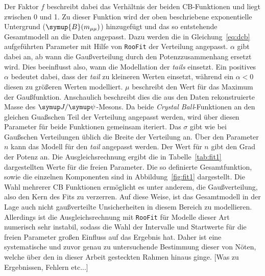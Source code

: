 %
Der Faktor $f$ beschreibt dabei das Verhältnis der beiden CB-Funktionen und liegt zwischen 0 und 1. Zu dieser Funktion wird der oben beschriebene exponentielle Untergrund ($\symup{B}(m_{\mu\mu})$) hinzugefügt und das so entstehende Gesamtmodell an die Daten angepasst. Dazu werden die in Gleichung~\eqref{eq:dcb} aufgeführten Parameter mit Hilfe von \texttt{RooFit} der Verteilung angepasst.
%
%
%
$\alpha$ gibt dabei an, ab wann die Gaußverteilung durch den Potenzzusammenhang ersetzt wird. Dies beeinflusst also, wann die Modellation der \textit{tails}
einsetzt. Ein positives $\alpha$ bedeutet dabei, dass der \textit{tail} zu kleineren Werten einsetzt, während ein $\alpha<0$
diesen zu größeren Werten modelliert. $\mu$ beschreibt den Wert für das Maximum der Gaußfunktion. Anschaulich beschreibt dies die aus
den Daten rekonstruierte Masse des $\jpsi$-Mesons. Da beide \textit{Crystal Ball}-Funktionen an den gleichen Guaßschen Teil der Verteilung angepasst werden,
wird über diesen Parameter für beide Funktionen gemeinsam iteriert. Das $\sigma$ gibt wie bei Gaußschen Verteilungen üblich die Breite der Verteilung an. Über den Parameter $n$ kann das Modell für den \textit{tail} angepasst werden. Der Wert für $n$ gibt den Grad der Potenz an.
Die Ausgleichsrechnung ergibt die in Tabelle~\ref{tab:fit1} dargestellten Werte für die freien Parameter. Die so definierte Gesamtfunktion, sowie die einzelnen Komponenten sind in Abbildung~\ref{fig:fit1} dargestellt. Die Wahl mehrerer CB Funktionen ermöglicht es unter anderem, die Gaußverteilung, also den Kern des Fits zu verzerren. Auf diese Weise, ist das Gesamtmodell in der Lage auch nicht gaußverteilte Unsicherheiten in diesem Bereich zu modellieren. Allerdings ist die Ausgleichsrechnung mit \texttt{RooFit} für Modelle dieser Art numerisch sehr instabil, sodass die Wahl der Intervalle und Startwerte für die freien Parameter großen Einfluss auf das Ergebnis hat. Daher ist eine systematische und zuvor genau zu untersuchende Bestimmung dieser von Nöten, welche über den in dieser Arbeit gesteckten Rahmen hinaus ginge. [Was zu Ergebnissen, Fehlern etc...]
